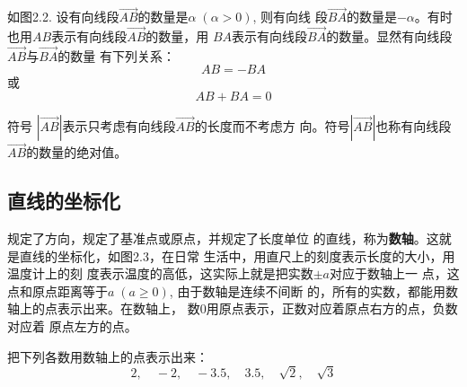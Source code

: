 如图2.2. 设有向线段$\Vec{AB}$的数量是$\alpha\; (\alpha>0)$, 则有向线
段$\Vec{BA}$的数量是$-\alpha$。有时也用$AB$表示有向线段$\Vec{AB}$的数量，用
${BA}$表示有向线段$\Vec{BA}$的数量。显然有向线段$\Vec{AB}$与$\Vec{BA}$的数量
有下列关系：
\[AB=-BA\]
或\[AB+BA=0\]

符号
$|\Vec{AB}|$表示只考虑有向线段$\Vec{AB}$的长度而不考虑方
向。符号$|\Vec{AB}|$也称有向线段$\Vec{AB}$的数量的绝对值。

\subsection{直线的坐标化}
规定了方向，规定了基准点或原点，并规定了长度单位
的直线，称为\textbf{数轴}。这就是直线的坐标化，如图2.3，在日常
生活中，用直尺上的刻度表示长度的大小，用温度计上的刻
度表示温度的高低，这实际上就是把实数$\pm a$对应于数轴上一
点，这点和原点距离等于$a\; (a\ge 0)$, 由于数轴是连续不间断
的，所有的实数，都能用数轴上的点表示出来。在数轴上，
数0用原点表示，正数对应着原点右方的点，负数对应着
原点左方的点。

\begin{figure}[htp]
    \centering
{}
    \caption{}
\end{figure}

\begin{example}
    把下列各数用数轴上的点表示出来：
\[2,\quad -2,\quad -3.5,\quad 3.5,\quad \sqrt{2},\quad \sqrt{3}\]
\end{example}

